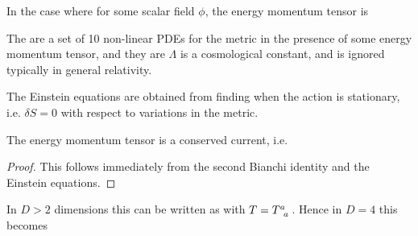 \documentclass{article}
\begin{document}
\begin{example}
In the case where 
for some scalar field $\phi$, the energy momentum tensor is 
\end{example}

\begin{definition}
The  are a set of 10 non-linear PDEs for the metric in the presence of some energy momentum tensor, and they are 
$\Lambda$ is a cosmological constant, and is ignored typically in general relativity. 
\end{definition}

\begin{theorem}
The Einstein equations are obtained from finding when the action 
is stationary, i.e. $\delta S = 0$ with respect to variations in the metric. 
\end{theorem}

\begin{lemma}
The energy momentum tensor is a conserved current, i.e. 
\end{lemma}
\begin{proof}
This follows immediately from the second Bianchi identity and the Einstein equations. 
\end{proof}

\begin{prop}
In $D>2$ dimensions this can be written as 
with $T=T\indices{^a_a}$. Hence 
in $D=4$ this becomes 
\end{prop}

\end{document}
